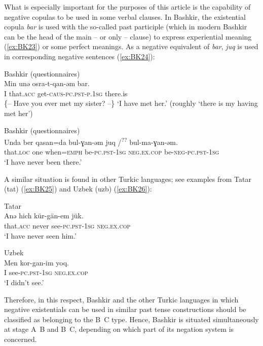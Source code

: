 \documentclass[output=paper]{langsci/langscibook}
\begin{document}
What is especially important for the purposes of this article is the capability of negative copulas to be used in some verbal clauses. In Bashkir, the existential copula \textit{bar} is used with the so-called past participle (which in modern Bashkir can be the head of the main – or only – clause) to express experiential meaning (\ref{ex:BK23}) or some perfect meanings. As a negative equivalent of \textit{bar}, \textit{juq} is used in corresponding negative sentences (\ref{ex:BK24}):

\ea Bashkir (questionnaires) \label{ex:BK23}\\
	\gll Min	unǝ		osra-t-qan-ǝm				bar.\\
	I		that.\textsc{acc}	get-\textsc{caus-pc.pst-p.1sg}	there.is\\
	\glt \{– Have you ever met my sister? –\} `I have met her.' (roughly `there is my having met her')
\z

\ea Bashkir (questionnaires) \label{ex:BK24}\\
	\gll Unda		ber	qasan=da		bul-ɣan-ǝm		juq {/\textsuperscript{??} bul-ma-ɣan-ǝm.}\\
	that.\textsc{loc}	one	when=\textsc{emph}	be-\textsc{pc.pst-1sg}	\textsc{neg.ex.cop}  be-\textsc{neg-pc.pst-1sg}\\
	\glt `I have never been there.'
\z

A similar situation is found in other Turkic languages; see examples from Tatar (tat) (\ref{ex:BK25}) and Uzbek (uzb) (\ref{ex:BK26}):

\ea Tatar \citep[126]{poppe1961a} \label{ex:BK25}\\
	\gll Anǝ		hich		kür-gän-em			jük.\\
	that.\textsc{acc}	never		see-\textsc{pc.pst-1sg}	\textsc{neg.ex.cop}\\
	\glt `I have never seen him.'\footnotemark
\z


\ea Uzbek \citep[123]{sjoberg1963a} \label{ex:BK26}\\
	\gll Men	kor-gan-im			yoq.\\
	I		see-\textsc{pc.pst-1sg}	\textsc{neg.ex.cop}\\
	\glt `I didn’t see.'
\z

Therefore, in this respect, Bashkir and the other Turkic languages in which negative existentials can be used in similar past tense constructions should be classified as belonging to the B~C type. Hence, Bashkir is situated simultaneously at stage A~B and B~C, depending on which part of its negation system is concerned.
\end{document}
